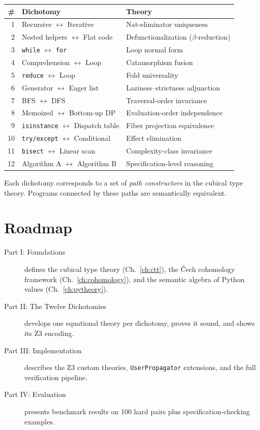 \documentclass[11pt,a4paper]{report}
\theoremstyle{definition}
\theoremstyle{plain}
\begin{document}
\begin{center}
\begin{tabular}{r l l}
  \textbf{\#} & \textbf{Dichotomy} & \textbf{Theory} \\
  \hline
  1 & Recursive $\leftrightarrow$ Iterative &
      Nat-eliminator uniqueness \\
  2 & Nested helpers $\leftrightarrow$ Flat code &
      Defunctionalization ($\beta$-reduction) \\
  3 & \texttt{while} $\leftrightarrow$ \texttt{for} &
      Loop normal form \\
  4 & Comprehension $\leftrightarrow$ Loop &
      Catamorphism fusion \\
  5 & \texttt{reduce} $\leftrightarrow$ Loop &
      Fold universality \\
  6 & Generator $\leftrightarrow$ Eager list &
      Laziness--strictness adjunction \\
  7 & BFS $\leftrightarrow$ DFS &
      Traversal-order invariance \\
  8 & Memoized $\leftrightarrow$ Bottom-up DP &
      Evaluation-order independence \\
  9 & \texttt{isinstance} $\leftrightarrow$ Dispatch table &
      Fiber projection equivalence \\
  10 & \texttt{try/except} $\leftrightarrow$ Conditional &
      Effect elimination \\
  11 & \texttt{bisect} $\leftrightarrow$ Linear scan &
      Complexity-class invariance \\
  12 & Algorithm A $\leftrightarrow$ Algorithm B &
      Specification-level reasoning \\
\end{tabular}
\end{center}

Each dichotomy corresponds to a set of \emph{path constructors} in the
cubical type theory.  Programs connected by these paths are semantically
equivalent.

\section{Roadmap}

\begin{description}
  \item[Part I: Foundations] defines the cubical type theory (Ch.\
    \ref{ch:ctt}), the \v{C}ech cohomology framework (Ch.\
    \ref{ch:cohomology}), and the semantic algebra of Python values
    (Ch.\ \ref{ch:pytheory}).
  \item[Part II: The Twelve Dichotomies] develops one equational theory
    per dichotomy, proves it sound, and shows its Z3 encoding.
  \item[Part III: Implementation] describes the Z3 custom theories,
    \texttt{UserPropagator} extensions, and the full verification
    pipeline.
  \item[Part IV: Evaluation] presents benchmark results on 100 hard
    pairs plus specification-checking examples.
\end{description}
\end{document}
